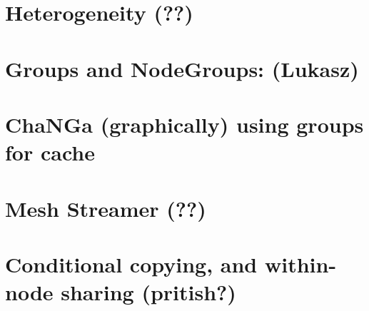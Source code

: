 \documentclass{beamer}
\begin{document}
\section{Heterogeneity (??)}
\section{Groups and NodeGroups: (Lukasz) }
\section{ChaNGa (graphically) using groups for cache}
\section{Mesh Streamer (??)}
\section{Conditional copying, and within-node sharing (pritish?)}
\end{document}
